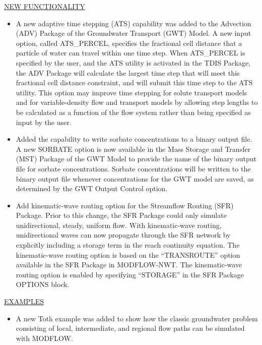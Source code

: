 	
	\item \currentmodflowversion
	
	\underline{NEW FUNCTIONALITY}
	\begin{itemize}
		\item A new adaptive time stepping (ATS) capability was added to the Advection (ADV) Package of the Groundwater Transport (GWT) Model.  A new input option, called ATS\_PERCEL, specifies the fractional cell distance that a particle of water can travel within one time step.  When ATS\_PERCEL is specified by the user, and the ATS utility is activated in the TDIS Package, the ADV Package will calculate the largest time step that will meet this fractional cell distance constraint, and will submit this time step to the ATS utility.  This option may improve time stepping for solute transport models and for variable-density flow and transport models by allowing step lengths to be calculated as a function of the flow system rather than being specified as input by the user.
		\item Added the capability to write sorbate concentrations to a binary output file.  A new SORBATE option is now available in the Mass Storage and Transfer (MST) Package of the GWT Model to provide the name of the binary output file for sorbate concentrations. Sorbate concentrations will be written to the binary output file whenever concentrations for the GWT model are saved, as determined by the GWT Output Control option.
		\item Add kinematic-wave routing option for the Streamflow Routing (SFR) Package. Prior to this change, the SFR Package could only simulate unidirectional, steady, uniform flow. With kinematic-wave routing, unidirectional waves can now propagate through the SFR network by explicitly including a storage term in the reach continuity equation. The kinematic-wave routing option is based on the ``TRANSROUTE'' option available in the SFR Package in MODFLOW-NWT. The kinematic-wave routing option is enabled by specifying ``STORAGE'' in the SFR Package OPTIONS block.
	\end{itemize}

	\underline{EXAMPLES}
	\begin{itemize}
		\item A new Toth example was added to show how the classic groundwater problem consisting of local, intermediate, and regional flow paths can be simulated with MODFLOW.
	\end{itemize}


